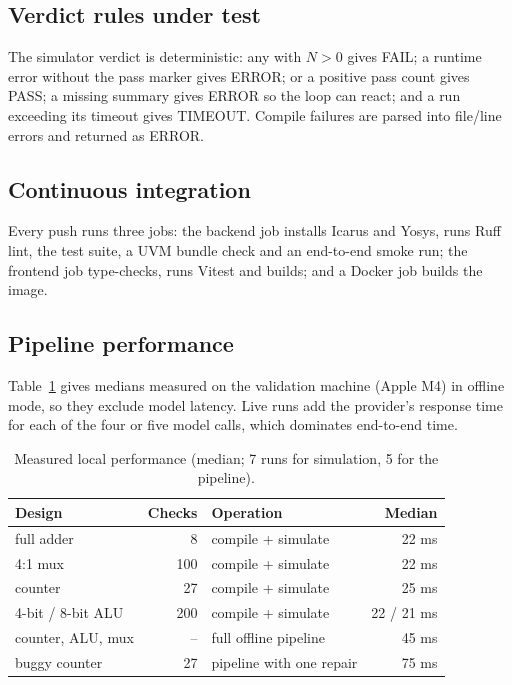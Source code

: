 \documentclass[11pt,a4paper]{article}
\newcommand{\code}[1]{\texttt{\detokenize{#1}}}
\begin{document}
\subsection{Verdict rules under test}
The simulator verdict is deterministic: any \code{Failed: N} with $N>0$ gives FAIL; a runtime error without the pass marker gives ERROR; \code{ALL TESTS PASSED} or a positive pass count gives PASS; a missing summary gives ERROR so the loop can react; and a run exceeding its timeout gives TIMEOUT. Compile failures are parsed into file/line errors and returned as ERROR.

\subsection{Continuous integration}
Every push runs three jobs: the backend job installs Icarus and Yosys, runs Ruff lint, the test suite, a UVM bundle check and an end-to-end smoke run; the frontend job type-checks, runs Vitest and builds; and a Docker job builds the image.

\subsection{Pipeline performance}
\label{sec:perf}
Table~\ref{tab:perf} gives medians measured on the validation machine (Apple M4) in offline mode, so they exclude model latency. Live runs add the provider's response time for each of the four or five model calls, which dominates end-to-end time.

\begin{table}[H]
\centering
\caption{Measured local performance (median; 7 runs for simulation, 5 for the pipeline).}
\label{tab:perf}
\small
\begin{tabular}{@{}l r l r@{}}
\toprule
\textbf{Design} & \textbf{Checks} & \textbf{Operation} & \textbf{Median} \\
\midrule
full adder & 8 & compile + simulate & 22 ms \\
4:1 mux & 100 & compile + simulate & 22 ms \\
counter & 27 & compile + simulate & 25 ms \\
4-bit / 8-bit ALU & 200 & compile + simulate & 22 / 21 ms \\
counter, ALU, mux & -- & full offline pipeline & 45 ms \\
buggy counter & 27 & pipeline with one repair & 75 ms \\
\bottomrule
\end{tabular}
\end{table}
\end{document}
